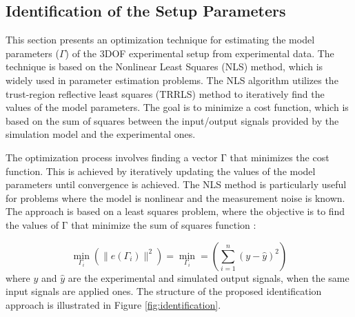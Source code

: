 \documentclass[3p,times]{elsarticle}
\begin{document}
\subsection{Identification of the Setup Parameters}
\noindent This section presents an optimization technique for estimating the model parameters ($\Gamma$) of the 3DOF experimental setup from experimental data. The technique is based on the Nonlinear Least Squares (NLS) method, which is widely used in parameter estimation problems. The NLS algorithm utilizes the trust-region reflective least squares (TRRLS) method to iteratively find the values of the model parameters. The goal is to minimize a cost function, which is based on the sum of squares between the input/output signals provided by the simulation model and the experimental ones.

The optimization process involves finding a vector $\boldsymbol{\mathrm{\Gamma}}$ that minimizes the cost function. This is achieved by iteratively updating the values of the model parameters until convergence is achieved. The NLS method is particularly useful for problems where the model is nonlinear and the measurement noise is known. The approach is based on a least squares problem, where the objective is to find the values of $\boldsymbol{\mathrm{\Gamma}}$ that minimize the sum of squares function \cite{article_Eriksson}:

\begin{equation}
	\min_{\Gamma_i}\left(\parallel e(\Gamma_i) \parallel^2\right) = 
	\min_{\Gamma_i} = \left(\sum_{i=1}^{n}(y-\hat y)^2\right)
\end{equation}
where $y$ and $\hat y$ are the experimental and simulated output signals, when the same input signals are applied ones.
The structure of the proposed identification approach is illustrated in Figure \ref{fig:identification}.
\end{document}
